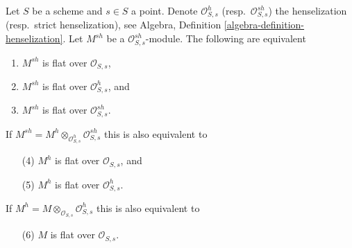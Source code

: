 \begin{lemma}
\label{lemma-flat-up-down-henselization}
Let $S$ be a scheme and $s \in S$ a point. Denote $\mathcal{O}_{S, s}^h$
(resp.\ $\mathcal{O}_{S, s}^{sh}$) the henselization (resp.\ strict
henselization), see
Algebra, Definition \ref{algebra-definition-henselization}.
Let $M^{sh}$ be a $\mathcal{O}_{S, s}^{sh}$-module.
The following are equivalent
\begin{enumerate}
\item $M^{sh}$ is flat over $\mathcal{O}_{S, s}$,
\item $M^{sh}$ is flat over $\mathcal{O}_{S, s}^h$, and
\item $M^{sh}$ is flat over $\mathcal{O}_{S, s}^{sh}$.
\end{enumerate}
If $M^{sh} = M^h \otimes_{\mathcal{O}_{S, s}^h} \mathcal{O}_{S, s}^{sh}$
this is also equivalent to
\begin{enumerate}
\item[(4)] $M^h$ is flat over $\mathcal{O}_{S, s}$, and
\item[(5)] $M^h$ is flat over $\mathcal{O}_{S, s}^h$.
\end{enumerate}
If $M^h = M \otimes_{\mathcal{O}_{S, s}} \mathcal{O}_{S, s}^h$
this is also equivalent to
\begin{enumerate}
\item[(6)] $M$ is flat over $\mathcal{O}_{S, s}$.
\end{enumerate}
\end{lemma}

